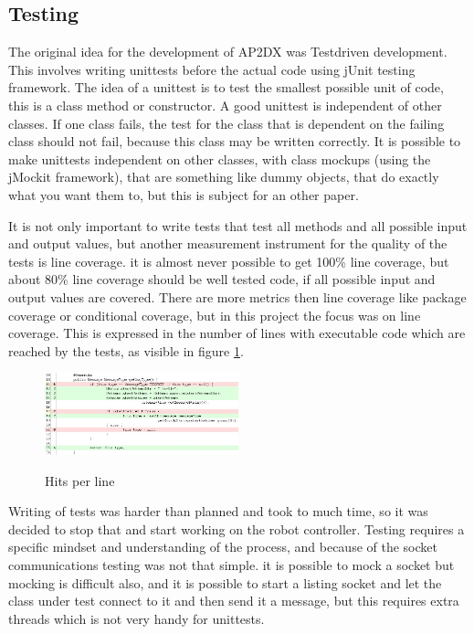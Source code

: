 \documentclass[titlepage, a4paper,10pt]{article}
\begin{document}
\subsection{Testing}
The original idea for the development of AP2DX was Testdriven development. This involves writing unittests before the actual code using jUnit testing framework. The idea of a unittest is to test the smallest possible unit of code, this is a class method or constructor. A good unittest is independent of other classes. If one class fails, the test for the class that is dependent on the failing class should not fail, because this class may be written correctly. It is possible to make unittests independent on other classes, with class mockups (using the jMockit framework), that are something like dummy objects, that do exactly what you want them to, but this is subject for an other paper.

It is not only important to write tests that test all methods and all possible input and output values, but another measurement instrument for the quality of the tests is line coverage. it is almost never possible to get 100\% line coverage, but about 80\% line coverage should be well tested code, if all possible input and output values are covered. There are more metrics then line coverage like package coverage or conditional coverage, but in this project the focus was on line coverage. This is expressed in the number of lines with executable code which are reached by the tests, as visible in figure \ref{fig:hits}.

\begin{figure}[h]
  \caption{Hits per line}
  \centering
    \includegraphics[width=0.5\textwidth]{hits}
  \label{fig:hits}
\end{figure}

Writing of tests was harder than planned and took to much time, so it was decided to stop that and start working on the robot controller. Testing requires a specific mindset and understanding of the process, and because of the socket communications testing was not that simple. it is possible to mock a socket but mocking is difficult also, and it is possible to start a listing socket and let the class under test connect to it and then send it a message, but this requires extra threads which is not very handy for unittests.
\end{document}
